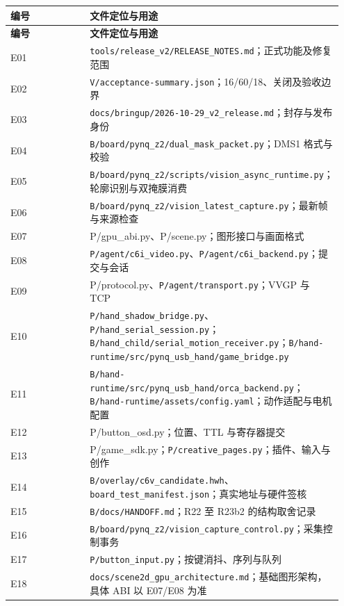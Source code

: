{\small\renewcommand{\arraystretch}{1.28}
\begin{longtable}{@{}>{\raggedright\arraybackslash}p{0.29\linewidth}>{\raggedright\arraybackslash}p{0.66\linewidth}@{}}
\toprule
\bfseries 编号 & \bfseries 文件定位与用途\\\midrule
\endfirsthead
\toprule
\bfseries 编号 & \bfseries 文件定位与用途\\\midrule
\endhead
\bottomrule\endfoot
E01 & \nolinkurl{tools/release_v2/RELEASE_NOTES.md}；正式功能及修复范围\\
E02 & \nolinkurl{V/acceptance-summary.json}；16/60/18、关闭及验收边界\\
E03 & \nolinkurl{docs/bringup/2026-10-29_v2_release.md}；封存与发布身份\\
E04 & \nolinkurl{B/board/pynq_z2/dual_mask_packet.py}；DMS1 格式与校验\\
E05 & \nolinkurl{B/board/pynq_z2/scripts/vision_async_runtime.py}；轮廓识别与双掩膜消费\\
E06 & \nolinkurl{B/board/pynq_z2/vision_latest_capture.py}；最新帧与来源检查\\
E07 & P/gpu\_abi.py、P/scene.py；图形接口与画面格式\\
E08 & \nolinkurl{P/agent/c6i_video.py}、\nolinkurl{P/agent/c6i_backend.py}；提交与会话\\
E09 & P/protocol.py、\nolinkurl{P/agent/transport.py}；VVGP 与 TCP\\
E10 & \nolinkurl{P/hand_shadow_bridge.py}、\nolinkurl{P/hand_serial_session.py}；\nolinkurl{B/hand_child/serial_motion_receiver.py}；\nolinkurl{B/hand-runtime/src/pynq_usb_hand/game_bridge.py}\\
E11 & \nolinkurl{B/hand-runtime/src/pynq_usb_hand/orca_backend.py}；\nolinkurl{B/hand-runtime/assets/config.yaml}；动作适配与电机配置\\
E12 & P/button\_osd.py；位置、TTL 与寄存器提交\\
E13 & P/game\_sdk.py；\nolinkurl{P/creative_pages.py}；插件、输入与创作\\
E14 & \nolinkurl{B/overlay/c6v_candidate.hwh}、\nolinkurl{board_test_manifest.json}；真实地址与硬件签核\\
E15 & \nolinkurl{B/docs/HANDOFF.md}；R22 至 R23b2 的结构取舍记录\\
E16 & \nolinkurl{B/board/pynq_z2/vision_capture_control.py}；采集控制事务\\
E17 & \nolinkurl{P/button_input.py}；按键消抖、序列与队列\\
E18 & \nolinkurl{docs/scene2d_gpu_architecture.md}；基础图形架构，具体 ABI 以 E07/E08 为准\\

\end{longtable}}
